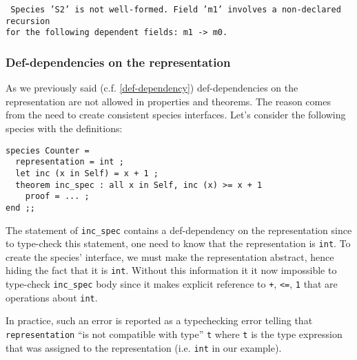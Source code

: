 \noindent
{\scriptsize
{\tt
Species 'S2' is not well-formed. Field
'm1' involves a non-declared recursion\\
for the following dependent fields: m1 -> m0.
}
}

\subsubsection{Def-dependencies on the representation}
\label{def-dep-on-representation}
As we previously said (c.f. \ref{def-dependency}) def-dependencies on
the representation are not allowed in properties and theorems. The reason
comes from the need to create consistent species interfaces. Let's
consider the following species with the definitions:
{\scriptsize
\begin{lstlisting}
species Counter =
  representation = int ;
  let inc (x in Self) = x + 1 ;
  theorem inc_spec : all x in Self, inc (x) >= x + 1
    proof = ... ;
end ;;
\end{lstlisting}
}

The statement of {\tt inc\_spec} contains a def-dependency on the
representation since to type-check this statement, one need to know
that the representation is  {\tt int}. To create the species'
interface, we must make the representation abstract, hence hiding the
fact that it is {\tt int}. Without this information it it now
impossible to type-check  {\tt inc\_spec}  body since it
makes explicit reference to {\tt +}, {\tt <=}, {\tt 1} that are
operations about {\tt int}.

In practice, such an error is reported as a typechecking error telling
that {\tt representation} ``is not compatible with type'' {\tt t}
where {\tt t} is the type expression that was assigned to the
representation (i.e. {\tt int} in our example).
